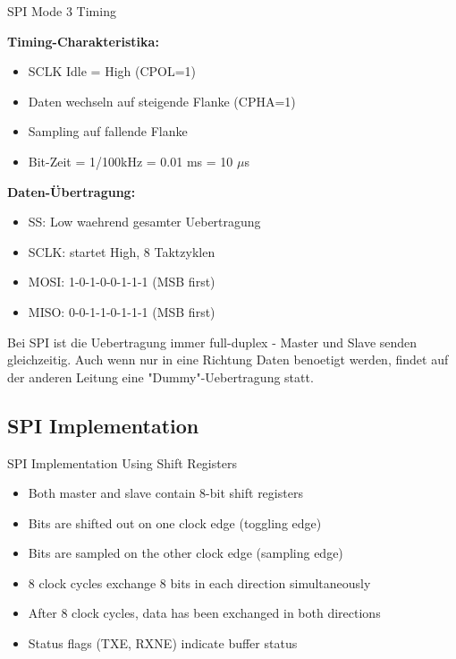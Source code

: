 \begin{example2}{SPI Mode 3 Timing}
    \begin{minipage}{0.5\linewidth}
        \textbf{Timing-Charakteristika:}
    \begin{itemize}
        \item SCLK Idle = High (CPOL=1)
        \item Daten wechseln auf steigende Flanke (CPHA=1)
        \item Sampling auf fallende Flanke
        \item Bit-Zeit = 1/100kHz = 0.01 ms = 10 $\mu$s
    \end{itemize}
    \end{minipage}
    \begin{minipage}{0.5\linewidth}
        \textbf{Daten-Übertragung:}
    \begin{itemize}
        \item SS: Low waehrend gesamter Uebertragung
        \item SCLK: startet High, 8 Taktzyklen
        \item MOSI: 1-0-1-0-0-1-1-1 (MSB first)
        \item MISO: 0-0-1-1-0-1-1-1 (MSB first)
    \end{itemize}
    \end{minipage}
\end{example2}

\begin{remark}
    Bei SPI ist die Uebertragung immer full-duplex - Master und Slave senden gleichzeitig. Auch wenn nur in eine Richtung Daten benoetigt werden, findet auf der anderen Leitung eine "Dummy"-Uebertragung statt.
\end{remark}









\subsection{SPI Implementation}

\begin{concept}{SPI Implementation Using Shift Registers}
\begin{itemize}
    \item Both master and slave contain 8-bit shift registers
    \item Bits are shifted out on one clock edge (toggling edge)
    \item Bits are sampled on the other clock edge (sampling edge)
    \item 8 clock cycles exchange 8 bits in each direction simultaneously
    \item After 8 clock cycles, data has been exchanged in both directions
    \item Status flags (TXE, RXNE) indicate buffer status
\end{itemize}
\end{concept}


